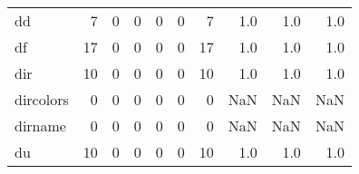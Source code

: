 \begin{longtable}{lrrrrrrrrr}
dd        &                                                  7 &                                                  0 &                                                  0 &                                                  0 &                                                  0 &                                                  7 &                                                1.0 &                                    1.0 &                                  1.0 \\
df        &                                                 17 &                                                  0 &                                                  0 &                                                  0 &                                                  0 &                                                 17 &                                                1.0 &                                    1.0 &                                  1.0 \\
dir       &                                                 10 &                                                  0 &                                                  0 &                                                  0 &                                                  0 &                                                 10 &                                                1.0 &                                    1.0 &                                  1.0 \\
dircolors &                                                  0 &                                                  0 &                                                  0 &                                                  0 &                                                  0 &                                                  0 &                                                NaN &                                    NaN &                                  NaN \\
dirname   &                                                  0 &                                                  0 &                                                  0 &                                                  0 &                                                  0 &                                                  0 &                                                NaN &                                    NaN &                                  NaN \\
du        &                                                 10 &                                                  0 &                                                  0 &                                                  0 &                                                  0 &                                                 10 &                                                1.0 &                                    1.0 &                                  1.0 \\

\end{longtable}
